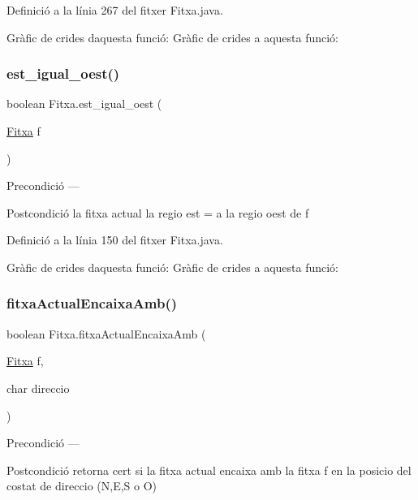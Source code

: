 Definició a la línia 267 del fitxer Fitxa.\+java.

Gràfic de crides d\textquotesingle{}aquesta funció\+:
Gràfic de crides a aquesta funció\+:
\mbox{\label{class_fitxa_a592a69fa34ca3548fc170498b3440927}} 
\subsubsection{\texorpdfstring{est\+\_\+igual\+\_\+oest()}{est\_igual\_oest()}}
{\footnotesize\ttfamily boolean Fitxa.\+est\+\_\+igual\+\_\+oest (\begin{DoxyParamCaption}\item[{\mbox{\hyperlink{class_fitxa}{Fitxa}}}]{f }\end{DoxyParamCaption})}

\begin{DoxyPrecond}{Precondició}
--- 
\end{DoxyPrecond}
\begin{DoxyPostcond}{Postcondició}
la fitxa actual la regio est = a la regio oest de f 
\end{DoxyPostcond}


Definició a la línia 150 del fitxer Fitxa.\+java.

Gràfic de crides d\textquotesingle{}aquesta funció\+:
Gràfic de crides a aquesta funció\+:
\mbox{\label{class_fitxa_a7d959d3cdc32495bcf1c2f0f58fe4678}} 
\subsubsection{\texorpdfstring{fitxa\+Actual\+Encaixa\+Amb()}{fitxaActualEncaixaAmb()}}
{\footnotesize\ttfamily boolean Fitxa.\+fitxa\+Actual\+Encaixa\+Amb (\begin{DoxyParamCaption}\item[{\mbox{\hyperlink{class_fitxa}{Fitxa}}}]{f,  }\item[{char}]{direccio }\end{DoxyParamCaption})}

\begin{DoxyPrecond}{Precondició}
--- 
\end{DoxyPrecond}
\begin{DoxyPostcond}{Postcondició}
retorna cert si la fitxa actual encaixa amb la fitxa \textquotesingle{}f\textquotesingle{} en la posicio del costat de \textquotesingle{}direccio\textquotesingle{} (\textquotesingle{}N\textquotesingle{},\textquotesingle{}E\textquotesingle{},\textquotesingle{}S\textquotesingle{} o \textquotesingle{}O\textquotesingle{}) 
\end{DoxyPostcond}


